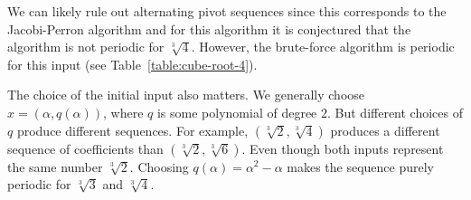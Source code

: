 We can likely rule out alternating pivot sequences since this corresponds to
the Jacobi-Perron algorithm and for this algorithm it is conjectured
\cite{Karpenkov21} that the algorithm is not periodic for $\sqrt[3]{4}$.
However, the brute-force algorithm is periodic for this input (see Table~\ref{table:cube-root-4}).

The choice of the initial input also matters.
We generally choose $x = (α, q(α))$, where $q$ is some polynomial of degree $2$.
But different choices of $q$ produce different sequences.
For example, $(\sqrt[3]{2}, \sqrt[3]{4})$ produces a different sequence of coefficients than $(\sqrt[3]{2}, \sqrt[3]{6})$.
Even though both inputs represent the same number $\sqrt[3]{2}$.
Choosing $q(α) = α^2 - α$ makes the sequence purely periodic for $\sqrt[3]{3}$ and $\sqrt[3]{4}$.
